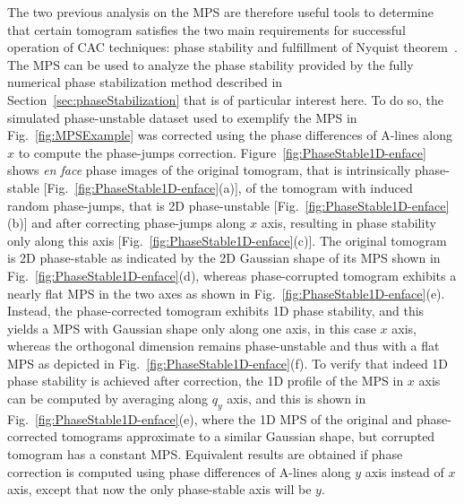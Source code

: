 The two previous analysis on the MPS are therefore useful tools to determine that certain tomogram satisfies the two main requirements for successful operation of CAC techniques: phase stability and fulfillment of Nyquist theorem~\cite{Ruiz-Lopera2020_Computational}. The MPS can be used to analyze the phase stability provided by the fully numerical phase stabilization method described in Section~\ref{sec:phaseStabilization} that is of particular interest here. To do so, the simulated phase-unstable dataset used to exemplify the MPS in Fig.~\ref{fig:MPSExample} was corrected using the phase differences of A-lines along $x$ to compute the phase-jumps correction. Figure~\ref{fig:PhaseStable1D-enface} shows \textit{en face} phase images of the original tomogram, that is intrinsically phase-stable [Fig.~\ref{fig:PhaseStable1D-enface}(a)], of the tomogram with induced random phase-jumps, that is 2D phase-unstable [Fig.~\ref{fig:PhaseStable1D-enface}(b)] and after correcting phase-jumps along $x$ axis, resulting in phase stability only along this axis [Fig.~\ref{fig:PhaseStable1D-enface}(c)]. The original tomogram is 2D phase-stable as indicated by the 2D Gaussian shape of its MPS shown in Fig.~\ref{fig:PhaseStable1D-enface}(d), whereas phase-corrupted tomogram exhibits a nearly flat MPS in the two axes as shown in Fig.~\ref{fig:PhaseStable1D-enface}(e). Instead, the phase-corrected tomogram exhibits 1D phase stability, and this yields a MPS with Gaussian shape only along one axis, in this case $x$ axis, whereas the orthogonal dimension remains phase-unstable and thus with a flat MPS as depicted in Fig.~\ref{fig:PhaseStable1D-enface}(f). To verify that indeed 1D phase stability is achieved after correction, the 1D profile of the MPS in $x$ axis can be computed by averaging along $q_y$ axis, and this is shown in Fig.~\ref{fig:PhaseStable1D-enface}(e), where the 1D MPS of the original and phase-corrected tomograms approximate to a similar Gaussian shape, but corrupted tomogram has a constant MPS. Equivalent results are obtained if phase correction is computed using phase differences of A-lines along $y$ axis instead of $x$ axis, except that now the only phase-stable axis will be $y$.


